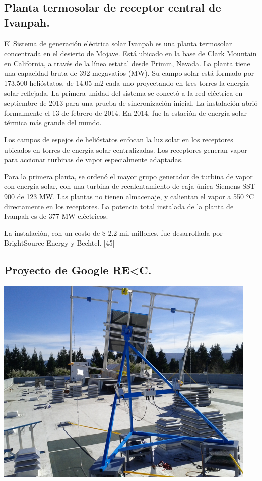 \documentclass[12pt]{article}
\begin{document}
\subsection{Planta termosolar de receptor central de Ivanpah.}

El Sistema de generación eléctrica solar Ivanpah es una planta termosolar concentrada en el desierto de Mojave. Está ubicado en la base de Clark Mountain en California, a través de la línea estatal desde Primm, Nevada. La planta tiene una capacidad bruta de 392 megavatios (MW). Su campo solar está formado por 173,500 helióstatos, de 14.05 m2 cada uno proyectando en tres torres la energía solar reflejada. La primera unidad del sistema se conectó a la red eléctrica en septiembre de 2013 para una prueba de sincronización inicial. La instalación abrió formalmente el 13 de febrero de 2014. En 2014, fue la estación de energía solar térmica más grande del mundo.
 
Los campos de espejos de helióstatos enfocan la luz solar en los receptores ubicados en torres de energía solar centralizadas. Los receptores generan vapor para accionar turbinas de vapor especialmente adaptadas.
 
Para la primera planta, se ordenó el mayor grupo generador de turbina de vapor con energía solar, con una turbina de recalentamiento de caja única Siemens SST-900 de 123 MW. Las plantas no tienen almacenaje, y calientan el vapor a 550 °C directamente en los receptores. La potencia total instalada de la planta de Ivanpah es de 377 MW eléctricos.
 
La instalación, con un costo de \$ 2.2 mil millones, fue desarrollada por BrightSource Energy y Bechtel. [45]



\subsection{Proyecto de Google RE\textless C.}

\includegraphics{HeliostatoGoogle}
\end{document}
